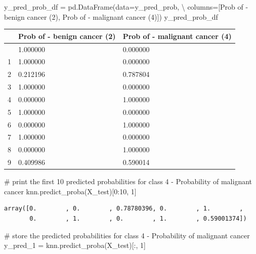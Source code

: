 \documentclass[
  letterpaper,
  DIV=11,
  numbers=noendperiod]{scrreprt}
\newenvironment{Shaded}{\begin{snugshade}}{\end{snugshade}}
\newcommand{\CommentTok}[1]{\textcolor[rgb]{0.37,0.37,0.37}{#1}}
\newcommand{\DecValTok}[1]{\textcolor[rgb]{0.68,0.00,0.00}{#1}}
\newcommand{\NormalTok}[1]{\textcolor[rgb]{0.00,0.23,0.31}{#1}}
\newcommand{\OperatorTok}[1]{\textcolor[rgb]{0.37,0.37,0.37}{#1}}
\newcommand{\StringTok}[1]{\textcolor[rgb]{0.13,0.47,0.30}{#1}}
\newcounter{none} %
\begin{document}
\begin{Shaded}
\begin{Highlighting}[]
\NormalTok{y\_pred\_prob\_df }\OperatorTok{=}\NormalTok{ pd.DataFrame(data}\OperatorTok{=}\NormalTok{y\_pred\_prob, }\OperatorTok{\textbackslash{}}
\NormalTok{columns}\OperatorTok{=}\NormalTok{[}\StringTok{\textquotesingle{}Prob of {-} benign cancer (2)\textquotesingle{}}\NormalTok{, }\StringTok{\textquotesingle{}Prob of {-} malignant cancer (4)\textquotesingle{}}\NormalTok{])}
\NormalTok{y\_pred\_prob\_df}
\end{Highlighting}
\end{Shaded}

{\def\LTcaptype{none} %
\begin{longtable}[]{@{}lll@{}}
\toprule\noalign{}
& Prob of - benign cancer (2) & Prob of - malignant cancer (4) \\
\midrule\noalign{}
\endhead
\bottomrule\noalign{}
\endlastfoot
0 & 1.000000 & 0.000000 \\
1 & 1.000000 & 0.000000 \\
2 & 0.212196 & 0.787804 \\
3 & 1.000000 & 0.000000 \\
4 & 0.000000 & 1.000000 \\
5 & 1.000000 & 0.000000 \\
6 & 0.000000 & 1.000000 \\
7 & 1.000000 & 0.000000 \\
8 & 0.000000 & 1.000000 \\
9 & 0.409986 & 0.590014 \\
\end{longtable}
}

\begin{Shaded}
\begin{Highlighting}[]
\CommentTok{\# print the first 10 predicted probabilities for class 4 {-} Probability of malignant cancer}
\NormalTok{knn.predict\_proba(X\_test)[}\DecValTok{0}\NormalTok{:}\DecValTok{10}\NormalTok{, }\DecValTok{1}\NormalTok{]}
\end{Highlighting}
\end{Shaded}

\begin{verbatim}
array([0.        , 0.        , 0.78780396, 0.        , 1.        ,
       0.        , 1.        , 0.        , 1.        , 0.59001374])
\end{verbatim}

\begin{Shaded}
\begin{Highlighting}[]
\CommentTok{\# store the predicted probabilities for class 4 {-} Probability of malignant cancer}
\NormalTok{y\_pred\_1 }\OperatorTok{=}\NormalTok{ knn.predict\_proba(X\_test)[:, }\DecValTok{1}\NormalTok{]}
\end{Highlighting}
\end{Shaded}
\end{document}
